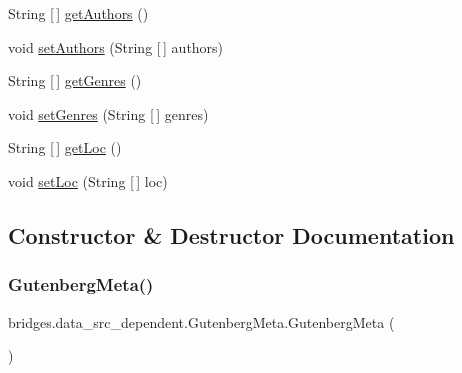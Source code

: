 \begin{DoxyCompactItemize}
\item 
String \mbox{[}$\,$\mbox{]} \hyperlink{classbridges_1_1data__src__dependent_1_1_gutenberg_meta_ade26e52ccf14390a58c58182fafbd11e}{get\+Authors} ()
\item 
void \hyperlink{classbridges_1_1data__src__dependent_1_1_gutenberg_meta_a7d07af71a31dd30782d5a030bdbe3fcc}{set\+Authors} (String \mbox{[}$\,$\mbox{]} authors)
\item 
String \mbox{[}$\,$\mbox{]} \hyperlink{classbridges_1_1data__src__dependent_1_1_gutenberg_meta_a5e53b89cfac6bf2d731f95b534a1e056}{get\+Genres} ()
\item 
void \hyperlink{classbridges_1_1data__src__dependent_1_1_gutenberg_meta_a71f1a8bc28bc5de8a23e9b0e9bd56a75}{set\+Genres} (String \mbox{[}$\,$\mbox{]} genres)
\item 
String \mbox{[}$\,$\mbox{]} \hyperlink{classbridges_1_1data__src__dependent_1_1_gutenberg_meta_aa1df46217b95819c2b6c19473a950e80}{get\+Loc} ()
\item 
void \hyperlink{classbridges_1_1data__src__dependent_1_1_gutenberg_meta_a2f8663728f81657379df3616e59222be}{set\+Loc} (String \mbox{[}$\,$\mbox{]} loc)
\end{DoxyCompactItemize}


\subsection{Constructor \& Destructor Documentation}
\mbox{\label{classbridges_1_1data__src__dependent_1_1_gutenberg_meta_ab734ffe82b6483d89072791818df0296}} 
\subsubsection{\texorpdfstring{Gutenberg\+Meta()}{GutenbergMeta()}\hspace{0.1cm}{\footnotesize\ttfamily [1/2]}}
{\footnotesize\ttfamily bridges.\+data\+\_\+src\+\_\+dependent.\+Gutenberg\+Meta.\+Gutenberg\+Meta (\begin{DoxyParamCaption}{ }\end{DoxyParamCaption})}

